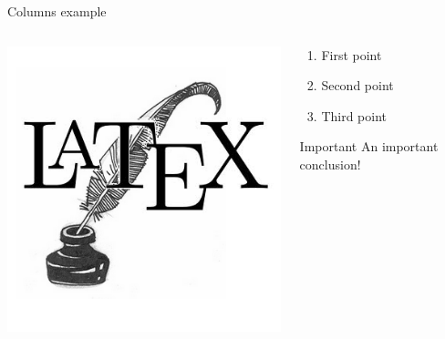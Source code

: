 \documentclass[english, 10pt, aspectratio=169]{beamer}
\begin{document}
\begin{frame}{Columns example}

\begin{columns}
\begin{column}[c]{0.5\textwidth}
\centering\includegraphics[width=0.8\hsize]{example}
\end{column}

\begin{column}[c]{0.5\textwidth}
\begin{enumerate}
\item First point
\item Second point
\item Third point
\end{enumerate}

\begin{block}{Important}
An important conclusion!
\end{block}
\end{column}
\end{columns}

\end{frame}
\end{document}
